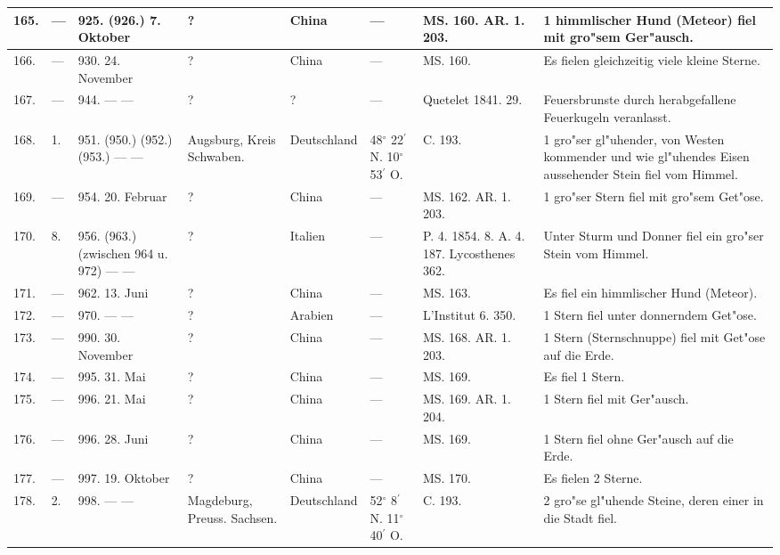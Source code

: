 \documentclass[a4paper, 8pt, oneside, polutonikogreek, german]{article}
\begin{document}
\begin{center}
\begin{longtable}{| p{5mm} | p{3mm} | p{15mm} | p{25mm} | p{20mm} | p{14mm} | p{17mm} | p{24mm} |}
        165. & --- & 925. (926.) 7. Oktober & ? & China & --- & MS. 160. AR. 1. 203. & 1 himmlischer Hund (Meteor) fiel mit gro"sem Ger"ausch. \\ \hline
        166. & --- & 930. 24. November & ? & China & --- & MS. 160. & Es fielen gleichzeitig viele kleine Sterne. \\ \hline
        167. & --- & 944. --- --- & ? & ? & --- & Quetelet 1841. 29. & Feuersbrunste durch herabgefallene Feuerkugeln veranlasst. \\ \hline
        168. & 1. & 951. (950.) (952.) (953.) --- --- & Augsburg, Kreis Schwaben. & Deutschland & 48$^\circ$ 22$^\prime$ N. 10$^\circ$ 53$^\prime$ O. & C. 193. & 1 gro"ser gl"uhender, von Westen kommender und wie gl"uhendes Eisen aussehender Stein fiel vom Himmel. \\ \hline
        169. & --- & 954. 20. Februar & ? & China & --- & MS. 162. AR. 1. 203. & 1 gro"ser Stern fiel mit gro"sem Get"ose. \\ \hline
        170. & 8. & 956. (963.) (zwischen 964 u. 972) --- --- & ? & Italien & --- & P. 4. 1854. 8. A. 4. 187. Lycosthenes 362. & Unter Sturm und Donner fiel ein gro"ser Stein vom Himmel. \\ \hline
        171. & --- & 962. 13. Juni & ? & China & --- & MS. 163. & Es fiel ein himmlischer Hund (Meteor). \\ \hline
        172. & --- & 970. --- --- & ? & Arabien & --- & L’Institut 6. 350. & 1 Stern fiel unter donnerndem Get"ose. \\ \hline
        173. & --- & 990. 30. November & ? & China & --- & MS. 168. AR. 1. 203. & 1 Stern (Sternschnuppe) fiel mit Get"ose auf die Erde. \\ \hline
        174. & --- & 995. 31. Mai & ? & China & --- & MS. 169. & Es fiel 1 Stern. \\ \hline
        175. & --- & 996. 21. Mai & ? & China & --- & MS. 169. AR. 1. 204. & 1 Stern fiel mit Ger"ausch. \\ \hline
        176. & --- & 996. 28. Juni & ? & China & --- & MS. 169. & 1 Stern fiel ohne Ger"ausch auf die Erde. \\ \hline
        177. & --- & 997. 19. Oktober & ? & China & --- & MS. 170. & Es fielen 2 Sterne. \\ \hline
        178. & 2. & 998. --- --- & Magdeburg, Preuss. Sachsen. & Deutschland & 52$^\circ$ 8$^\prime$ N. 11$^\circ$ 40$^\prime$ O. & C. 193. & 2 gro"se gl"uhende Steine, deren einer in die Stadt fiel. \\ \hline

\end{longtable}
\end{center}
\end{document}
